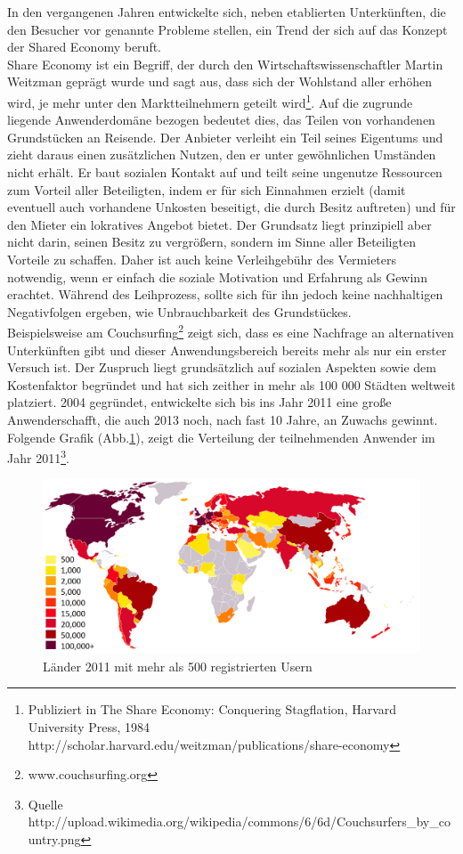 In den vergangenen Jahren entwickelte sich, neben etablierten Unterkünften, die den Besucher vor genannte Probleme stellen, ein Trend der sich auf das Konzept der Shared Economy beruft.\\
Share Economy ist ein Begriff, der durch den Wirtschaftswissenschaftler Martin Weitzman geprägt wurde und sagt aus, dass sich der Wohlstand aller erhöhen wird, je mehr unter den Marktteilnehmern geteilt wird\footnote{Publiziert in The Share Economy: Conquering Stagflation, Harvard University Press, 1984 \\http://scholar.harvard.edu/weitzman/publications/share-economy}. Auf die zugrunde liegende Anwenderdomäne bezogen bedeutet dies, das Teilen von vorhandenen Grundstücken an Reisende. Der Anbieter verleiht ein Teil seines Eigentums und zieht daraus einen zusätzlichen Nutzen, den er unter gewöhnlichen Umständen nicht erhält. Er baut sozialen Kontakt auf und teilt seine ungenutze Ressourcen zum Vorteil aller Beteiligten, indem er für sich Einnahmen erzielt (damit eventuell auch vorhandene Unkosten beseitigt, die durch Besitz auftreten) und für den Mieter ein lokratives Angebot bietet. Der Grundsatz liegt prinzipiell aber nicht darin, seinen Besitz zu vergrößern, sondern im Sinne aller Beteiligten Vorteile zu schaffen. Daher ist auch keine Verleihgebühr des Vermieters notwendig, wenn er einfach die soziale Motivation und Erfahrung als Gewinn erachtet. Während des Leihprozess, sollte sich für ihn jedoch keine nachhaltigen Negativfolgen ergeben, wie Unbrauchbarkeit des Grundstückes. \\  


Beispielsweise am Couchsurfing\footnote{www.couchsurfing.org} zeigt sich, dass es eine Nachfrage an alternativen Unterkünften gibt und dieser Anwendungsbereich bereits mehr als nur ein erster Versuch ist. Der Zuspruch liegt grundsätzlich auf sozialen Aspekten sowie dem Kostenfaktor begründet und hat sich zeither in mehr als 100 000 Städten weltweit platziert. 2004 gegründet, entwickelte sich bis ins Jahr 2011 eine große Anwenderschafft, die auch 2013 noch, nach fast 10 Jahre, an Zuwachs gewinnt. 
\newpage
Folgende Grafik (Abb.\ref{Couchsurfer}), zeigt die Verteilung der teilnehmenden Anwender im Jahr 2011\footnote{Quelle http://upload.wikimedia.org/wikipedia/commons/6/6d/Couchsurfers\_by\_country.png}. 

\begin{figure}[H]
\centering
\includegraphics[width=1.0\textwidth]{./images/couchsurfers.png}
\caption{Länder 2011 mit mehr als 500 registrierten Usern} 
\label{Couchsurfer}
\end{figure}


